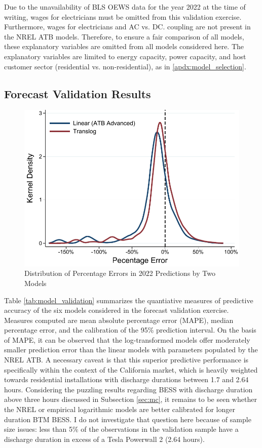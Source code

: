\documentclass[preprint,12pt,authoryear]{elsarticle}
\begin{document}
Due to the unavailability of BLS OEWS data for the year 2022 at the time of writing, wages for electricians must be omitted from this validation exercise. Furthermore, wages for electricians and AC vs. DC. coupling are not present in the NREL ATB models. Therefore, to ensure a fair comparison of all models, these explanatory variables are omitted from all models considered here. The explanatory variables are limited to energy capacity, power capacity, and host customer sector (residential vs. non-residential), as in \ref{apdx:model_selection}.

\subsection{Forecast Validation Results}\label{sec:validation_results}

\begin{figure}[t]
\includegraphics[width=\textwidth]{graphs/CA_SGIP/pct_error_dist.pdf}
\caption{Distribution of Percentage Errors in 2022 Predictions by Two Models}\label{fig:pct_error_dist}
\end{figure}

Table \ref{tab:model_validation} summarizes the quantiative measures of predictive accuracy of the six models considered in the forecast validation exercise. Measures computed are mean absolute percentage error (MAPE), median percentage error, and the calibration of the 95\% prediction interval. On the basis of MAPE, it can be observed that the log-transformed models offer moderately smaller prediction error than the linear models with parameters populated by the NREL ATB. A necessary caveat is that this superior predictive performance is specifically within the context of the California market, which is heavily weighted towards residential installations with discharge durations between 1.7 and 2.64 hours. Considering the puzzling results regarding BESS with discharge duration above three hours discussed in Subsection \ref{sec:mc}, it remains to be seen whether the NREL or empirical logarithmic models are better calibrated for longer duration BTM BESS. I do not investigate that question here because of sample size issues: less than 5\% of the observations in the validation sample have a discharge duration in excess of a Tesla Powerwall 2 (2.64 hours).
\end{document}
